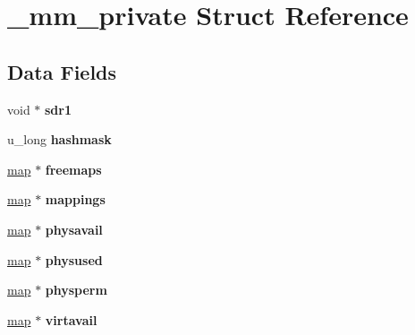 \hypertarget{struct__mm__private}{}\section{\+\_\+mm\+\_\+private Struct Reference}
\label{struct__mm__private}
\subsection*{Data Fields}
\begin{DoxyCompactItemize}
\item 
\mbox{\label{struct__mm__private_acece770cbd8dda5cd7eeec86b27d2d42}} 
void $\ast$ {\bfseries sdr1}
\item 
\mbox{\label{struct__mm__private_a2ecd6b90dfb977fa1c767c8b77335604}} 
u\+\_\+long {\bfseries hashmask}
\item 
\mbox{\label{struct__mm__private_a28943b414f0a17f14fef5dc83d99707e}} 
\mbox{\hyperlink{struct__map}{map}} $\ast$ {\bfseries freemaps}
\item 
\mbox{\label{struct__mm__private_a899beaeeefcfca3aaac9179c9b808996}} 
\mbox{\hyperlink{struct__map}{map}} $\ast$ {\bfseries mappings}
\item 
\mbox{\label{struct__mm__private_a8b6ceec5668e60ea4a01fcb5b3d7567d}} 
\mbox{\hyperlink{struct__map}{map}} $\ast$ {\bfseries physavail}
\item 
\mbox{\label{struct__mm__private_a60bd5b3eeb23e7bd1ce7042928faba54}} 
\mbox{\hyperlink{struct__map}{map}} $\ast$ {\bfseries physused}
\item 
\mbox{\label{struct__mm__private_a9a4274b97a29eb7b338a50e4c5524f30}} 
\mbox{\hyperlink{struct__map}{map}} $\ast$ {\bfseries physperm}
\item 
\mbox{\label{struct__mm__private_ab66e39153dc3997d3693e0f3a3484f7f}} 
\mbox{\hyperlink{struct__map}{map}} $\ast$ {\bfseries virtavail}
\item 
\mbox{\label{struct__mm__private_a31ad3348d9b131a49626f9be255624ad}} 

\end{DoxyCompactItemize}
